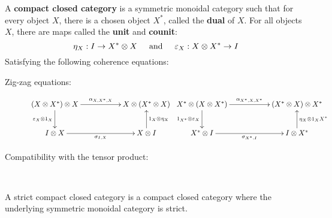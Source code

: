 \begin{definition}
A {\bf compact closed category} is a symmetric monoidal category such that for every object $X$, there is a chosen object $X^*$, called the {\bf dual} of $X$.
For all objects $X$, there are maps called the {\bf unit} and {\bf counit}:
$$
\eta_X:I\to X^* \otimes X\hspace*{.5cm}\text{and}\hspace*{.5cm} \epsilon_X:X\otimes X^*\to I 
$$
Satisfying the following coherence equations:
\begin{description}
\item[Zig-zag equations:]
$$
\xymatrix{
  (X\otimes X^*)\otimes X \ar[rr]^{\alpha_{X,X^*,X}}  \ar[d]_{\epsilon_X\otimes 1_X}
    & 
    & X\otimes(X^*\otimes X)
  \\I\otimes X \ar[rr]_{\sigma_{I,X}}
    &
    & X\otimes I \ar[u]_{1_X\otimes \eta_X}
}
\hspace*{.1cm}
\xymatrix{
  X^*\otimes ( X\otimes X^*) \ar[rr]^{\alpha_{X^*,X,X^*}}  \ar[d]_{1_{X^*}\otimes \epsilon_X}
    & 
    & (X^* \otimes X)\otimes X^*
  \\X^*\otimes I \ar[rr]_{\sigma_{X^*,I}}
    &
    & I\otimes X^* \ar[u]_{\eta_X\otimes 1_X{X^*}}
}
$$
\item[Compatibility with the tensor product:]\

\hspace*{-1.15cm}
\end{description}
A strict compact closed category is a compact closed category where the underlying symmetric monoidal category is strict.


\end{definition}
